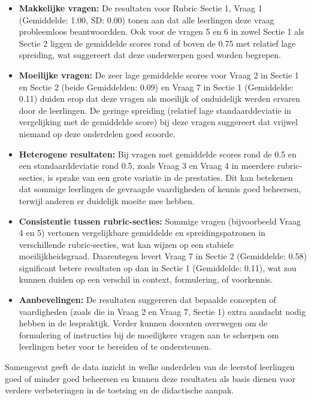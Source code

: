 \documentclass[12pt]{article}
\begin{document}
\noindent\begin{itemize}
    \item \textbf{Makkelijke vragen:} De resultaten voor Rubric Sectie 1, Vraag 1 (Gemiddelde: 1.00, SD: 0.00) tonen aan dat alle leerlingen deze vraag probleemloos beantwoordden. Ook voor de vragen 5 en 6 in zowel Sectie 1 als Sectie 2 liggen de gemiddelde scores rond of boven de 0.75 met relatief lage spreiding, wat suggereert dat deze onderwerpen goed worden begrepen.
    
    \item \textbf{Moeilijke vragen:} De zeer lage gemiddelde scores voor Vraag 2 in Sectie 1 en Sectie 2 (beide Gemiddelden: 0.09) en Vraag 7 in Sectie 1 (Gemiddelde: 0.11) duiden erop dat deze vragen als moeilijk of onduidelijk werden ervaren door de leerlingen. De geringe spreiding (relatief lage standaarddeviatie in vergelijking met de gemiddelde score) bij deze vragen suggereert dat vrijwel niemand op deze onderdelen goed scoorde.
    
    \item \textbf{Heterogene resultaten:} Bij vragen met gemiddelde scores rond de 0.5 en een standaarddeviatie rond 0.5, zoals Vraag 3 en Vraag 4 in meerdere rubric-secties, is sprake van een grote variatie in de prestaties. Dit kan betekenen dat sommige leerlingen de gevraagde vaardigheden of kennis goed beheersen, terwijl anderen er duidelijk moeite mee hebben.
    
    \item \textbf{Consistentie tussen rubric-secties:} Sommige vragen (bijvoorbeeld Vraag 4 en 5) vertonen vergelijkbare gemiddelde en spreidingspatronen in verschillende rubric-secties, wat kan wijzen op een stabiele moeilijkheidsgraad. Daarentegen levert Vraag 7 in Sectie 2 (Gemiddelde: 0.58) significant betere resultaten op dan in Sectie 1 (Gemiddelde: 0.11), wat zou kunnen duiden op een verschil in context, formulering, of voorkennis.
    
    \item \textbf{Aanbevelingen:}  
    De resultaten suggereren dat bepaalde concepten of vaardigheden (zoals die in Vraag 2 en Vraag 7, Sectie 1) extra aandacht nodig hebben in de lespraktijk. Verder kunnen docenten overwegen om de formulering of instructies bij de moeilijkere vragen aan te scherpen om leerlingen beter voor te bereiden of te ondersteunen.
\end{itemize}

Samengevat geeft de data inzicht in welke onderdelen van de leerstof leerlingen goed of minder goed beheersen en kunnen deze resultaten als basis dienen voor verdere verbeteringen in de toetsing en de didactische aanpak.
\pagebreak
\end{document}
